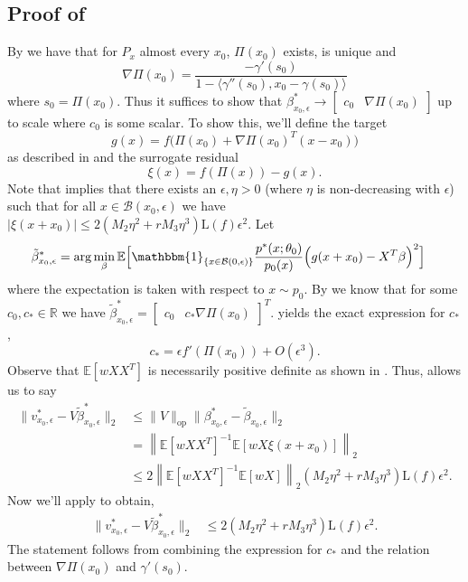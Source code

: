 \documentclass[11pt]{article}
\begin{document}
\subsection{Proof of } \label{sec: proof of population vel prop}
By  we have that for $P_x$ almost every $x_0$, $\Pi(x_0)$ exists, is unique and \[\nabla\Pi(x_0) = \frac{-\gamma'(s_0)}{1 - \langle \gamma''(s_0), x_0 - \gamma(s_0)\rangle}\]
where $s_0 = \Pi(x_0)$. Thus it suffices to show that $\beta^*_{x_0, \epsilon} \rightarrow  \begin{bmatrix}c_0 &  \nabla\Pi(x_0)\end{bmatrix}$ up to scale where $c_0$ is some scalar. To show this, we'll define the  target  
\[g(x) = f\Big(\Pi(x_0) + \nabla\Pi(x_0)^{T}(x-x_0)\Big)\]
as described in  and the surrogate residual 
\[\xi(x) = f(\Pi(x)) - g(x).\] Note that  implies that there exists an $\epsilon, \eta > 0$ (where $\eta$ is non-decreasing with $\epsilon$) such that for all $x \in \mathcal{B}(x_0, \epsilon)$ we have $|\xi(x + x_0)| \le 2(M_2\eta^2+rM_3\eta^3)\text{L}(f)\epsilon^2$. Let  
\begin{align}
    \tilde{\beta}^*_{x_0, \epsilon} &= \arg\min_{\beta}\mathbb{E}\Big[\mathbbm{1}_{\{x \in \mathcal{B}(0, \epsilon)\}}\frac{p^*(x;\theta_0)}{p_{0}(x)}\Big(g(x+x_0) - X^{T}\beta\Big)^2\Big] \label{eq: perturbed pop estimator}
\end{align}
where the expectation is taken with respect to $x \sim p_0$. By  we know that for some $c_0, c_* \in \mathbb{R}$ we have $\tilde{\beta}^*_{x_0, \epsilon}  =  \begin{bmatrix}
    c_0 & c_*\nabla\Pi(x_0)
\end{bmatrix}^T$.  yields the exact expression for $c_*$,
\[c_* = \epsilon f'(\Pi(x_0))+ O(\epsilon^3).\]
Observe that $\mathbb{E}[wXX^{T}]$ is necessarily positive definite as shown in . Thus,  allows us to say 
\begin{align*} 
\|v^*_{x_0, \epsilon} - V\tilde{\beta}_{x_0, \epsilon}^*\|_2 &\leq \|V\|_{\text{op}}\|\beta^*_{x_0, \epsilon} - \tilde\beta_{x_0, \epsilon}\|_2\\
&= \left\|\mathbb{E}[wXX^{T}]^{-1}\mathbb{E}[wX\xi(x+x_0)]\right\|_2 \\
&\leq 2\left\|\mathbb{E}[wXX^{T}]^{-1}\mathbb{E}[wX]\right\|_2(M_2\eta^2+rM_3\eta^3)\text{L}(f)\epsilon^2.
\end{align*}
Now we'll apply  to obtain,
\begin{align}
    \|v^*_{x_0, \epsilon} - V\tilde{\beta}_{x_0, \epsilon}^*\|_2 &\le 2(M_2\eta^2+rM_3\eta^3)\text{L}(f)\epsilon^2.
\end{align}
The statement follows from combining the expression for $c_*$ and the relation between $\nabla\Pi(x_0)$ and $\gamma'(s_0).$
\end{document}
